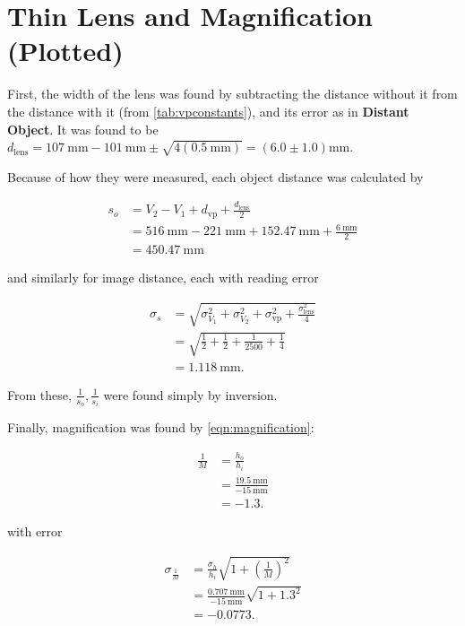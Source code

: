 \section{Thin Lens and Magnification (Plotted)}
First, the width of the lens was found by subtracting the distance without it from the distance with it (from \cref{tab:vpconstants}), and its error as in \textbf{Distant Object}. It was found to be $d_\text{lens} = \qty{107}{\milli\metre} - \qty{101}{\milli\metre} \pm \sqrt{4(\qty{0.5}{\milli\metre})} = (6.0 \pm 1.0) \unit{\milli\metre}$.

Because of how they were measured, each object distance was calculated by

\begin{align*}
    s_o &= V_2 - V_1 + d_\text{vp} + \frac{d_\text{lens}}{2} \\
    &= \qty{516}{\milli\metre} - \qty{221}{\milli\metre} + \qty{152.47}{\milli\metre} + \frac{\qty{6}{\milli\metre}}{2} \\
    &= \qty{450.47}{\milli\metre}
\end{align*}

and similarly for image distance, each with reading error 

\begin{align*}
    \sigma_s &= \sqrt{\sigma_{V_1}^2 + \sigma_{V_2}^2 + \sigma_\text{vp}^2 + \frac{\sigma_\text{lens}^2}{4}} \\
    &= \sqrt{\frac{1}{2} + \frac{1}{2} + \frac{1}{2500} + \frac{1}{4}} \\
    &= \qty{1.118}{\milli\metre}.
\end{align*}

From these, $\frac{1}{s_o}, \frac{1}{s_i}$ were found simply by inversion.

Finally, magnification was found by \cref{eqn:magnification}:

\begin{align*}
    \frac{1}{M} &= \frac{h_o}{h_i} \\
    &= \frac{\qty{19.5}{\milli\metre}}{-\qty{15}{\milli\metre}} \\
    &= -1.3.
\end{align*}

with error

\begin{align*}
    \sigma_\frac{1}{M} &= \frac{\sigma_h}{h_i} \sqrt{1 + \left(\frac{1}{M}\right)^2} \\
    &= \frac{\qty{0.707}{\milli\metre}}{-\qty{15}{\milli\metre}} \sqrt{1 + 1.3^2} \\
    &= -0.0773.
\end{align*}

